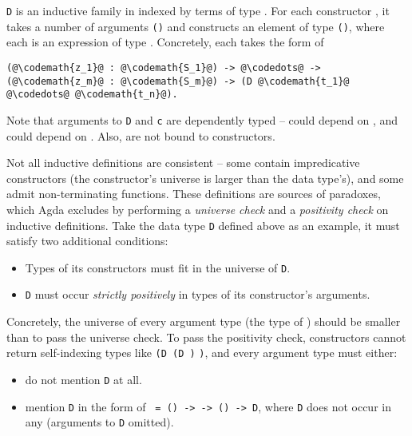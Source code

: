 \texttt{D} is an inductive family in  indexed by terms of type . For each constructor , it takes a number of arguments \texttt{()} and constructs an element of type \texttt{()}, where each  is an expression of type . Concretely, each  takes the form of
\begin{lstlisting}[escapechar=@]
(@\codemath{z_1}@ : @\codemath{S_1}@) -> @\codedots@ -> (@\codemath{z_m}@ : @\codemath{S_m}@) -> (D @\codemath{t_1}@ @\codedots@ @\codemath{t_n}@).
\end{lstlisting}
Note that arguments to \texttt{D} and \texttt{c} are dependently typed --  could depend on , and  could depend on . Also,  are not bound to constructors.

Not all inductive definitions are consistent -- some contain impredicative constructors (the constructor's universe is larger than the data type's), and some admit non-terminating functions. These definitions are sources of paradoxes, which Agda excludes by performing a \textit{universe check} and a \textit{positivity check} on inductive definitions. Take the data type \texttt{D} defined above as an example, it must satisfy two additional conditions:
\begin{itemize}
  \item Types of its constructors must fit in the universe of \texttt{D}.
  \item \texttt{D} must occur \textit{strictly positively} in types of its constructor's arguments.
\end{itemize}

Concretely, the universe of every argument type  (the type of ) should be smaller than  to pass the universe check. To pass the positivity check, constructors cannot return self-indexing types like \texttt{(D (D \codedots )} \texttt{\codedots )}, and every argument type  must either:
\begin{itemize}
  \item do not mention \texttt{D} at all.
  \item mention \texttt{D} in the form of \texttt{ = () -> \codemath{\cdots} -> () -> D}, where \texttt{D} does not occur in any  (arguments to \texttt{D} omitted).
\end{itemize}

